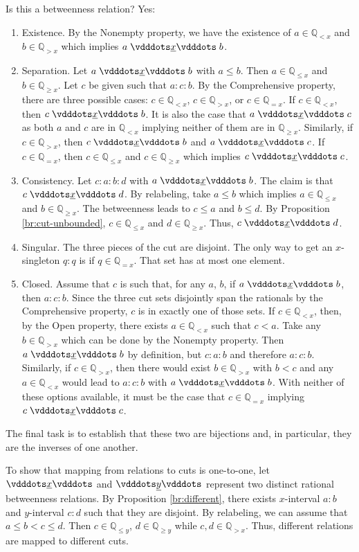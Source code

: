\documentclass[12pt]{article}
\newcommand{\qcut}[2][x]{\ensuremath{\mathbb{Q}_{#2 #1}}}
\newcommand{\qlt}[1][x]{\qcut[#1]{<}}
\newcommand{\qeq}[1][x]{\qcut[#1]{=}}
\newcommand{\qgt}[1][x]{\qcut[#1]{>}}
\newcommand{\qgeq}[1][x]{\qcut[#1]{\geq}}
\newcommand{\qleq}[1][x]{\qcut[#1]{\leq}}
\newcommand{\yrel}{\xrel[y]}
\begin{document}
Is this a betweenness relation? Yes: 
\begin{enumerate}
    \item Existence. By the Nonempty property, we have the existence of $a \in \qlt$ and $b \in \qgt$ which implies $a \xrel b$. 
    \item Separation. Let $a \xrel b$ with $a \leq b$.  Then $a \in \qleq$ and $b \in \qgeq$. Let $c$ be given such that $a:c:b$. By the Comprehensive property, there are three possible cases: $c \in \qlt$, $c \in \qgt$, or $c \in \qeq$. If $c \in \qlt$, then  $c \xrel b$. It is also the case that \sout{$a \xrel c$} as both $a$ and $c$ are in $\qlt$ implying neither of them are in $\qgeq$. Similarly, if $c \in \qgt$, then \sout{$c \xrel b$} and $a \xrel c$. If $c \in \qeq$, then $c \in \qleq$ and $c \in \qgeq$ which implies $c \xrel c$. 
    \item Consistency. Let $c:a:b:d$ with $ a \xrel b$. The claim is that $c \xrel d$. By relabeling, take $a \leq b$ which implies $a \in \qleq$ and $b \in \qgeq$.  The betweenness leads to $c \leq a$ and $ b \leq d$. By Proposition \ref{br:cut-unbounded},  $c \in \qleq$ and $ d \in \qgeq$. Thus, $c \xrel d$.
    \item Singular. The three pieces of the cut are disjoint. The only way to get an $x$-singleton $q:q$ is if $q \in \qeq$. That set has at most one element. 
    \item Closed. Assume that $c$ is such that, for any $a$, $b$, if $a \xrel b$, then $a:c:b$. Since the three cut sets disjointly span the rationals by the Comprehensive property, $c$ is in exactly one of those sets. If $c \in \qlt$, then, by the Open property, there exists $a \in \qlt$ such that $c < a$. Take any $b \in \qgt$ which can be done by the Nonempty property. Then $a \xrel b$ by definition, but $c: a:b$ and therefore \sout{$a:c:b$}. Similarly, if $c \in \qgt$, then there would exist $b \in \qgt$ with $b < c$ and any $a \in \qlt$ would lead to \sout{$a:c:b$} with $a \xrel b$. With neither of these options available, it must be the case that $c \in \qeq$ implying $c \xrel c$.    
\end{enumerate}

The final task is to establish that these two are bijections and, in particular, they are the inverses of one another. 

To show that mapping from relations to cuts is one-to-one, let $\xrel$ and $\yrel$ represent two distinct rational betweenness relations. By Proposition \ref{br:different}, there exists $x$-interval $a:b$ and $y$-interval $c:d$ such that they are disjoint. By relabeling, we can assume that $a \leq b < c \leq d$. Then $c \in \qleq[y]$, $d \in \qgeq[y]$ while $c, d \in \qgt[x]$. Thus, different relations are mapped to different cuts. 
\end{document}
